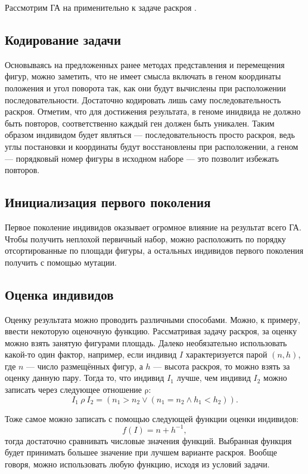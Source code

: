 \documentclass[14pt]{extarticle}
\begin{document}
	Рассмотрим ГА на применительно к задаче раскроя \cite{China}.
	\subsection{Кодирование задачи}
	Основываясь на предложенных ранее методах представления и перемещения фигур, можно заметить, что не имеет смысла включать в геном координаты положения и угол поворота так, как они будут вычислены при расположении последовательности. Достаточно кодировать лишь саму последовательность раскроя. Отметим, что для достижения результата, в геноме инидвида не должно быть повторов, соответственно каждый ген должен быть уникален. Таким образом индивидом будет являться --- последовательность просто раскроя, ведь углы постановки и координаты будут восстановлены при расположении, а геном --- порядковый номер фигуры в исходном наборе --- это позволит избежать повторов.
	\subsection{Инициализация первого поколения}
	Первое поколение индивидов оказывает огромное влияние на результат всего ГА. Чтобы получить неплохой первичный набор, можно расположить по порядку отсортированные по площади фигуры, а остальных индивидов первого поколения получить с помощью мутации.
	\subsection{Оценка индивидов}
	Оценку результата можно проводить различными способами. Можно, к примеру, ввести некоторую оценочную функцию. Рассматривая задачу раскроя, за оценку можно взять занятую фигурами площадь. Далеко необязательно использовать какой-то один фактор, например, если индивид $I$ характеризуется парой $(n, h)$, где $n$ --- число размещённых фигур, а $h$ --- высота раскроя, то можно взять за оценку данную пару. Тогда то, что индивид $I_1$ лучше, чем индивид $I_2$ можно записать через следующее отношение $\mathrm{\rho}$:
	\begin{equation}
		I_1~\rho~I_2=(n_1>n_2\lor(n_1=n_2\land h_1<h_2)).
	\end{equation}


	Тоже самое можно записать с помощью следующей функции оценки индивидов:
	\begin{equation}
		f(I)=n+h^{-1},
	\end{equation}
	тогда достаточно сравнивать числовые значения функций. Выбранная функция будет принимать большее значение при лучшем варианте раскроя. Вообще говоря, можно использовать любую функцию, исходя из условий задачи.
\end{document}
